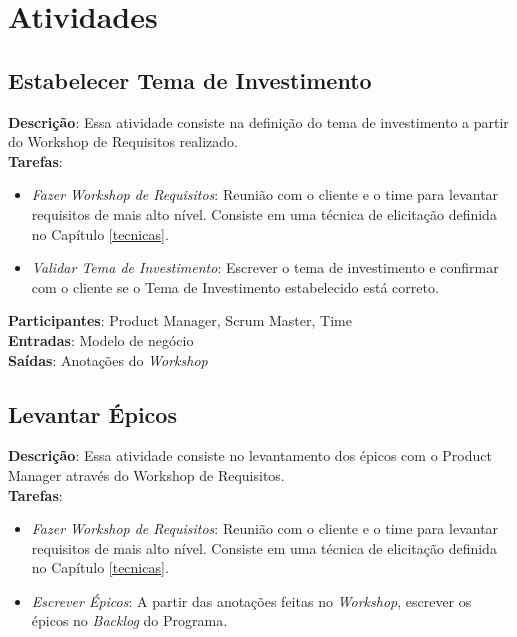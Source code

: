 \section{Atividades}

\subsection{Estabelecer Tema de Investimento}

  \textbf{Descrição}: Essa atividade consiste na definição do tema de investimento a partir do Workshop de Requisitos realizado.\\
  
  \textbf{Tarefas}: 
  
  \begin{itemize}
   \item \indent \textit{Fazer Workshop de Requisitos}: Reunião com o cliente e o time para levantar requisitos de mais alto nível. Consiste
   em uma técnica de elicitação definida no Capítulo \ref{tecnicas}.
   
   \item \indent \textit{Validar Tema de Investimento}: Escrever o tema de investimento e confirmar com o cliente se
   o Tema de Investimento estabelecido está correto.
  \end{itemize}
  
  \textbf{Participantes}: Product Manager, Scrum Master, Time \\
  
  \textbf{Entradas}: Modelo de negócio \\
  
  \textbf{Saídas}: Anotações do \textit{Workshop} \\

\subsection{Levantar Épicos}
  \textbf{Descrição}: Essa atividade consiste no levantamento dos épicos com o Product Manager através do Workshop de Requisitos. \\
 
  \textbf{Tarefas}: 
  
  \begin{itemize}
   \item \indent \textit{Fazer Workshop de Requisitos}: Reunião com o cliente e o time para levantar requisitos de mais alto nível. Consiste
   em uma técnica de elicitação definida no Capítulo \ref{tecnicas}.
   
   \item \indent \textit{Escrever Épicos}: A partir das anotações feitas no \textit{Workshop},
   escrever os épicos no \textit{Backlog} do Programa.
  \end{itemize}
  
